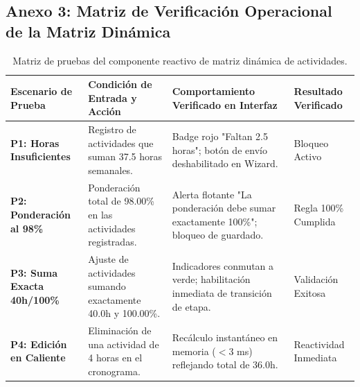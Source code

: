 \documentclass[12pt,a4paper]{article}
\begin{document}
\subsection*{Anexo 3: Matriz de Verificación Operacional de la Matriz Dinámica}
\begin{table}[H]
\centering
\small
\renewcommand{\arraystretch}{1.15}
\begin{tabularx}{\textwidth}{|>{\hsize=0.75\hsize\raggedright\arraybackslash\bfseries\footnotesize}X|>{\hsize=1.25\hsize\raggedright\arraybackslash\footnotesize}X|>{\hsize=1.35\hsize\raggedright\arraybackslash\footnotesize}X|>{\hsize=0.65\hsize\centering\arraybackslash\footnotesize}X|}
\hline
\rowcolor{tableheader}
\textbf{Escenario de Prueba} & \textbf{Condición de Entrada y Acción} & \textbf{Comportamiento Verificado en Interfaz} & \textbf{Resultado Verificado} \\
\hline
P1: Horas Insuficientes & Registro de actividades que suman 37.5 horas semanales. & Badge rojo "Faltan 2.5 horas"; botón de envío deshabilitado en Wizard. & Bloqueo Activo \\
\hline
P2: Ponderación al 98\% & Ponderación total de 98.00\% en las actividades registradas. & Alerta flotante "La ponderación debe sumar exactamente 100\%"; bloqueo de guardado. & Regla 100\% Cumplida \\
\hline
P3: Suma Exacta 40h/100\% & Ajuste de actividades sumando exactamente 40.0h y 100.00\%. & Indicadores conmutan a verde; habilitación inmediata de transición de etapa. & Validación Exitosa \\
\hline
P4: Edición en Caliente & Eliminación de una actividad de 4 horas en el cronograma. & Recálculo instantáneo en memoria ($<3$ ms) reflejando total de 36.0h. & Reactividad Inmediata \\
\hline
\end{tabularx}
\caption{Matriz de pruebas del componente reactivo de matriz dinámica de actividades.}
\end{table}
\end{document}
